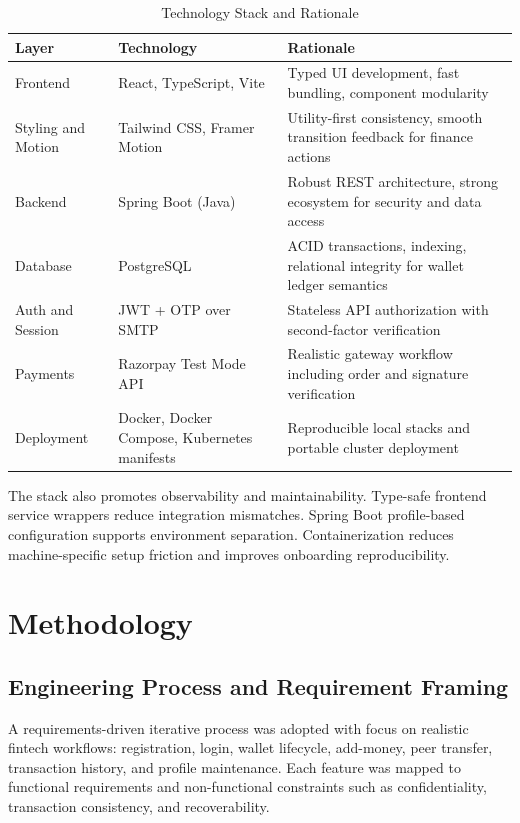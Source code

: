 \documentclass[conference]{IEEEtran}
\begin{document}
\begin{table}[t]
\caption{Technology Stack and Rationale}
\label{tab:stack}
\centering
\small
\begin{tabular}{p{1.8cm}p{2.2cm}p{3.3cm}}
\toprule
\textbf{Layer} & \textbf{Technology} & \textbf{Rationale} \\
\midrule
Frontend & React, TypeScript, Vite & Typed UI development, fast bundling, component modularity \\
\addlinespace
Styling and Motion & Tailwind CSS, Framer Motion & Utility-first consistency, smooth transition feedback for finance actions \\
\addlinespace
Backend & Spring Boot (Java) & Robust REST architecture, strong ecosystem for security and data access \\
\addlinespace
Database & PostgreSQL & ACID transactions, indexing, relational integrity for wallet ledger semantics \\
\addlinespace
Auth and Session & JWT + OTP over SMTP & Stateless API authorization with second-factor verification \\
\addlinespace
Payments & Razorpay Test Mode API & Realistic gateway workflow including order and signature verification \\
\addlinespace
Deployment & Docker, Docker Compose, Kubernetes manifests & Reproducible local stacks and portable cluster deployment \\
\bottomrule
\end{tabular}
\end{table}

The stack also promotes observability and maintainability. Type-safe frontend service wrappers reduce integration mismatches. Spring Boot profile-based configuration supports environment separation. Containerization reduces machine-specific setup friction and improves onboarding reproducibility.

\section{Methodology}
\subsection{Engineering Process and Requirement Framing}
A requirements-driven iterative process was adopted with focus on realistic fintech workflows: registration, login, wallet lifecycle, add-money, peer transfer, transaction history, and profile maintenance. Each feature was mapped to functional requirements and non-functional constraints such as confidentiality, transaction consistency, and recoverability.
\end{document}
